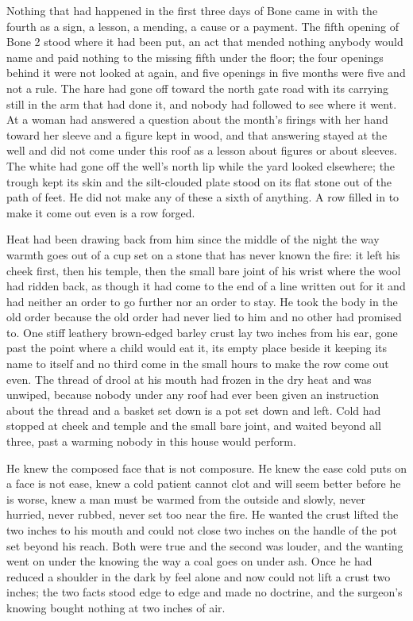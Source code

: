 Nothing that had happened in the first three days of Bone came in with the fourth as a sign, a lesson, a mending, a cause or a payment. The fifth opening of Bone 2 stood where it had been put, an act that mended nothing anybody would name and paid nothing to the missing fifth under the floor; the four openings behind it were not looked at again, and five openings in five months were five and not a rule. The hare had gone off toward the north gate road with its carrying still in the arm that had done it, and nobody had followed to see where it went. At  a woman had answered a question about the month's firings with her hand toward her sleeve and a figure kept in wood, and that answering stayed at the well and did not come under this roof as a lesson about figures or about sleeves. The white had gone off the well's north lip while the yard looked elsewhere; the trough kept its skin and the silt-clouded plate stood on its flat stone out of the path of feet. He did not make any of these a sixth of anything. A row filled in to make it come out even is a row forged.

Heat had been drawing back from him since the middle of the night the way warmth goes out of a cup set on a stone that has never known the fire: it left his cheek first, then his temple, then the small bare joint of his wrist where the wool had ridden back, as though it had come to the end of a line written out for it and had neither an order to go further nor an order to stay. He took the body in the old order because the old order had never lied to him and no other had promised to. One stiff leathery brown-edged barley crust lay two inches from his ear, gone past the point where a child would eat it, its empty place beside it keeping its name to itself and no third come in the small hours to make the row come out even. The thread of drool at his mouth had frozen in the dry heat and was unwiped, because nobody under any roof had ever been given an instruction about the thread and a basket set down is a pot set down and left. Cold had stopped at cheek and temple and the small bare joint, and  waited beyond all three, past a warming nobody in this house would perform.

He knew the composed face that is not composure. He knew the ease cold puts on a face is not ease, knew a cold patient cannot clot and will seem better before he is worse, knew a man must be warmed from the outside and slowly, never hurried, never rubbed, never set too near the fire. He wanted the crust lifted the two inches to his mouth and could not close two inches on the handle of the pot set beyond his reach. Both were true and the second was louder, and the wanting went on under the knowing the way a coal goes on under ash. Once he had reduced a shoulder in the dark by feel alone and now could not lift a crust two inches; the two facts stood edge to edge and made no doctrine, and the surgeon's knowing bought nothing at two inches of air.

